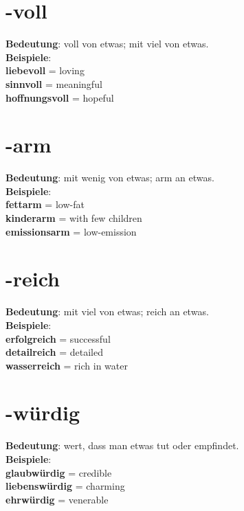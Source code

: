 \documentclass[a4paper]{article}
\begin{document}
    
    \section{-voll}
        \textbf{Bedeutung}: voll von etwas; mit viel von etwas.\\
        \textbf{Beispiele}:\\
        \textbf{liebevoll} = loving\\
        \textbf{sinnvoll} = meaningful\\
        \textbf{hoffnungsvoll} = hopeful\\
    
    
    \section{-arm}
        \textbf{Bedeutung}: mit wenig von etwas; arm an etwas.\\
        \textbf{Beispiele}:\\
        \textbf{fettarm} = low-fat\\
        \textbf{kinderarm} = with few children\\
        \textbf{emissionsarm} = low-emission\\
    
    
    \section{-reich}
        \textbf{Bedeutung}: mit viel von etwas; reich an etwas.\\
        \textbf{Beispiele}:\\
        \textbf{erfolgreich} = successful\\
        \textbf{detailreich} = detailed\\
        \textbf{wasserreich} = rich in water\\
    
    
    \section{-w\"urdig}
        \textbf{Bedeutung}: wert, dass man etwas tut oder empfindet.\\
        \textbf{Beispiele}:\\
        \textbf{glaubw\"urdig} = credible\\
        \textbf{liebensw\"urdig} = charming\\
        \textbf{ehrw\"urdig} = venerable\\
    
\end{document}
